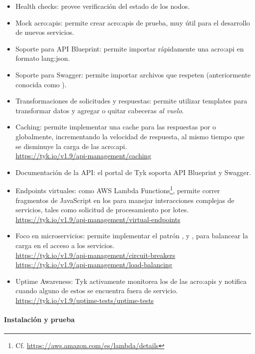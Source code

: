 \begin{itemize}
  \item Health checks: provee verificación del estado de los nodos.
  \item Mock \glspl{acro:api}: permite crear \glspl{acro:api} de prueba, muy útil para el desarrollo de nuevos servicios.
  \item Soporte para API Blueprint: permite importar rápidamente una \gls{acro:api} en formato \gls{lang:json}.
  \item Soporte para Swagger: permite importar archivos que respeten  (anteriormente conocida como ).
  \item Transformaciones de solicitudes y respuestas: permite utilizar templates para transformar datos y agregar o quitar cabeceras \textit{al vuelo}.
  \item Caching: permite implementar una cache para las respuestas por  o globalmente, incrementando la velocidad de respuesta, al mismo tiempo que se disminuye la carga de las \gls{acro:api}. \\
  \url{https://tyk.io/v1.9/api-management/caching}
  \item Documentación de la API: el portal de Tyk soporta API Blueprint y Swagger.
  \item Endpoints virtuales: como AWS Lambda Functions\footnote{Cf. \url{https://aws.amazon.com/es/lambda/details}}, permite correr fragmentos de JavaScript en los  para manejar interacciones complejas de servicios, tales como solicitud de procesamiento por lotes. \\
  \url{https://tyk.io/v1.9/api-management/virtual-endpoints}
  \item Foco en microservicios: permite implementar el patrón ,  y , para balancear la carga en el acceso a los servicios. \\
  \url{https://tyk.io/v1.9/api-management/circuit-breakers} \\
  \url{https://tyk.io/v1.9/api-management/load-balancing}
  \item Uptime Awareness: Tyk activamente monitorea los  de las \glspl{acro:api} y notifica cuando alguno de estos se encuentra fuera de servicio. \\
  \url{https://tyk.io/v1.9/uptime-tests/uptime-tests}
\end{itemize}

\paragraph{Instalación y prueba}

